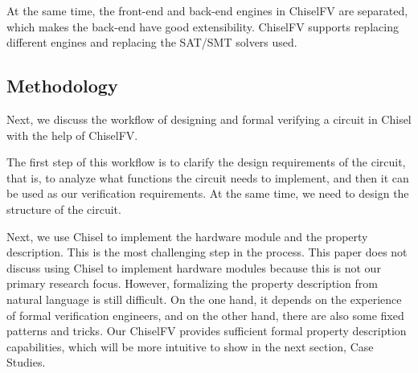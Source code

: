 \documentclass[conference]{IEEEtran}
\theoremstyle{definition}
\begin{document}

At the same time, the front-end and back-end engines in ChiselFV are separated, which makes the back-end have good extensibility. ChiselFV supports replacing different engines and replacing the SAT/SMT solvers used.

\subsection{Methodology}

Next, we discuss the workflow of designing and formal verifying a circuit in Chisel with the help of ChiselFV.

The first step of this workflow is to clarify the design requirements of the circuit, that is, to analyze what functions the circuit needs to implement, and then it can be used as our verification requirements. At the same time, we need to design the structure of the circuit.

Next, we use Chisel to implement the hardware module and the property description.
This is the most challenging step in the process. This paper does not discuss using Chisel to implement hardware modules because this is not our primary research focus. However, formalizing the property description from natural language is still difficult.
On the one hand, it depends on the experience of formal verification engineers, and on the other hand, there are also some fixed patterns and tricks. Our ChiselFV provides sufficient formal property description capabilities, which will be more intuitive to show in the next section, Case Studies.
\end{document}
